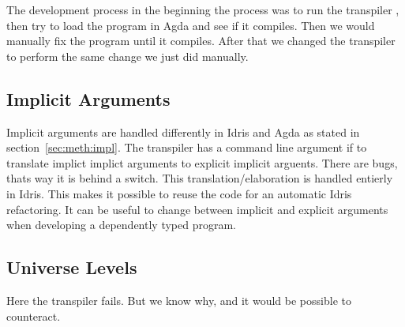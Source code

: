The development process in the beginning the process was to run the transpiler
, then try to load the program in Agda and see if it compiles.  Then we would
manually fix the program until it compiles.  After that we changed the
transpiler to perform the same change we just did manually.



\subsection{Implicit Arguments}
Implicit arguments are handled differently in Idris and Agda as
stated in section~\ref{sec:meth:impl}. The transpiler has a command line
argument if to translate implict implict arguments to explicit implicit
arguents. There are bugs, thats way it is behind a switch. This
translation/elaboration is handled entierly in Idris. This makes it possible to
reuse the code for an automatic Idris refactoring.  It can be useful to change
between implicit and explicit arguments when developing a dependently typed
program.







\subsection{Universe Levels}
Here the transpiler fails. But we know why, and it would be possible to
counteract.

